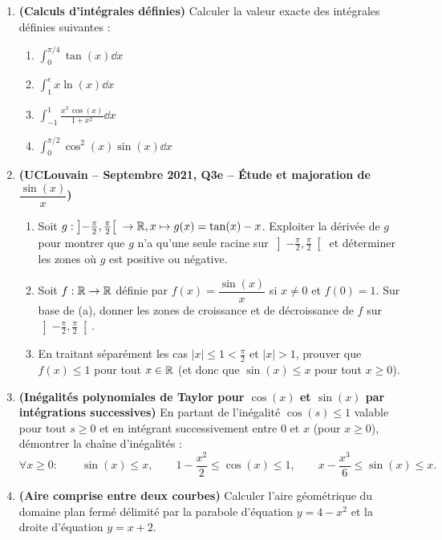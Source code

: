 \begin{enumerate}[label=\textbf{Exercice 7.\arabic* --}]
    \item \textbf{(Calculs d'intégrales définies)} Calculer la valeur exacte des intégrales définies suivantes :
    \begin{enumerate}
        \item $\displaystyle\int_0^{\pi/4} \tan(x)\dd x$
        \item $\displaystyle\int_1^e x\ln(x)\dd x$
        \item $\displaystyle\int_{-1}^1 \frac{x^3\,\cos(x)}{1 + x^2}\dd x$
        \item $\displaystyle\int_0^{\pi/2} \cos^2(x)\sin(x)\dd x$
    \end{enumerate}

    \item \textbf{(UCLouvain -- Septembre 2021, Q3e -- Étude et majoration de $\dfrac{\sin(x)}{x}$)}
    \begin{enumerate}
        \item Soit $g : \left]-\frac{\pi}{2}, \frac{\pi}{2}\right[ \;\to \mathbb{R}, x \mapsto g(x) = \tan(x) - x$. Exploiter la dérivée de $g$ pour montrer que $g$ n'a qu'une seule racine sur $\left]-\frac{\pi}{2}, \frac{\pi}{2}\right[$ et déterminer les zones où $g$ est positive ou négative.
        \item Soit $f : \mathbb{R} \to \mathbb{R}$ définie par $f(x) = \dfrac{\sin(x)}{x}$ si $x \neq 0$ et $f(0) = 1$. Sur base de (a), donner les zones de croissance et de décroissance de $f$ sur $\left]-\frac{\pi}{2}, \frac{\pi}{2}\right[$.
        \item En traitant séparément les cas $|x| \le 1 < \frac{\pi}{2}$ et $|x| > 1$, prouver que $f(x) \le 1$ pour tout $x \in \mathbb{R}$ (et donc que $\sin(x) \le x$ pour tout $x \ge 0$).
    \end{enumerate}

    \item \textbf{(Inégalités polynomiales de Taylor pour $\cos(x)$ et $\sin(x)$ par intégrations successives)}
    En partant de l'inégalité $\cos(s) \le 1$ valable pour tout $s \ge 0$ et en intégrant successivement entre $0$ et $x$ (pour $x \ge 0$), démontrer la chaîne d'inégalités :
    \[
        \forall x \ge 0 : \qquad \sin(x) \le x, \qquad 1 - \frac{x^2}{2} \le \cos(x) \le 1, \qquad x - \frac{x^3}{6} \le \sin(x) \le x.
    \]

    \item \textbf{(Aire comprise entre deux courbes)} Calculer l'aire géométrique du domaine plan fermé délimité par la parabole d'équation $y = 4 - x^2$ et la droite d'équation $y = x + 2$.


\end{enumerate}
